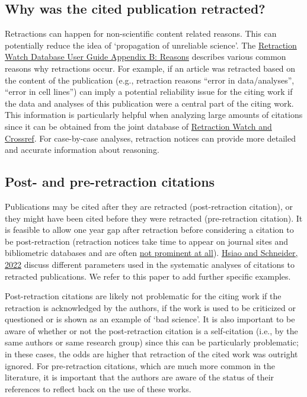 \documentclass[letterpaper, 12pt]{article}
\begin{document}
\subsection*{Why was the cited publication retracted?} 

Retractions can happen for non-scientific content related reasons. This can potentially reduce the idea of ‘propagation of unreliable science’. The \href{https://retractionwatch.com/retraction-watch-database-user-guide/retraction-watch-database-user-guide-appendix-b-reasons/}{Retraction Watch Database User Guide Appendix B: Reasons} describes various common reasons why retractions occur. For example, if an article was retracted based on the content of the publication (e.g., retraction reasons ``error in data/analyses'', ``error in cell lines'') can imply a potential reliability issue for the citing work if the data and analyses of this publication were a central part of the citing work. This information is particularly helpful when analyzing large amounts of citations since it can be obtained from the joint database of \href{https://gitlab.com/crossref/retraction-watch-data}{Retraction Watch and Crossref}. For case-by-case analyses, retraction notices can provide more detailed and accurate information about reasoning. 

\subsection*{Post- and pre-retraction citations}

Publications may be cited after they are retracted (post-retraction citation), or they might have been cited before they were retracted (pre-retraction citation). 
It is feasible to allow one year gap after retraction before considering a citation to be post-retraction (retraction notices take time to appear on journal sites and bibliometric databases and are often \href{https://retractionwatch.com/2024/07/05/how-you-can-help-improve-the-visibility-of-retractions-introducing-nisos-recommended-practice-for-communication-of-retractions-removals-and-expressions-of-concern-crec/}{not prominent at all}). \href{ https://doi.org/10.1162/qss_a_00155}{Hsiao and Schneider, 2022} discuss different parameters used in the systematic analyses of citations to retracted publications. We refer to this paper to add further specific examples.  

Post-retraction citations are likely not problematic for the citing work if the retraction is acknowledged by the authors, if the work is used to be criticized or questioned or is shown as an example of `bad science'. It is also important to be aware of whether or not the post-retraction citation is a self-citation (i.e., by the same authors or same research group) since this can be particularly problematic; in these cases, the odds are higher that retraction of the cited work was outright ignored. For pre-retraction citations, which are much more common in the literature, it is important that the authors are aware of the status of their references to reflect back on the use of these works. 
\end{document}
